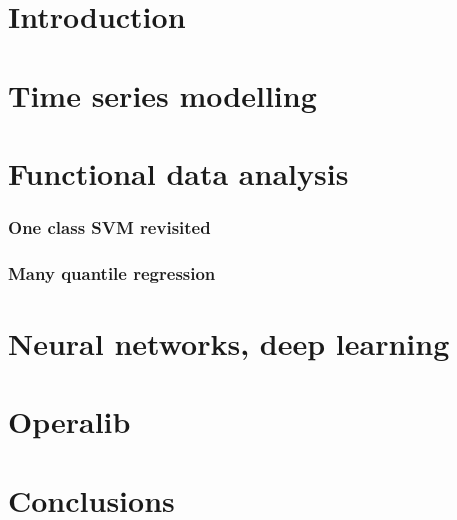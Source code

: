 
\section{Introduction}
\label{sec:ch05_background}


\section{Time series modelling}

\section{Functional data analysis}
\subsubsection{One class SVM revisited}

\subsubsection{Many quantile regression}

\section{Neural networks, deep learning}

\section{Operalib}

\section{Conclusions}
\label{sec:conslusions_contrib}

\chapterend

